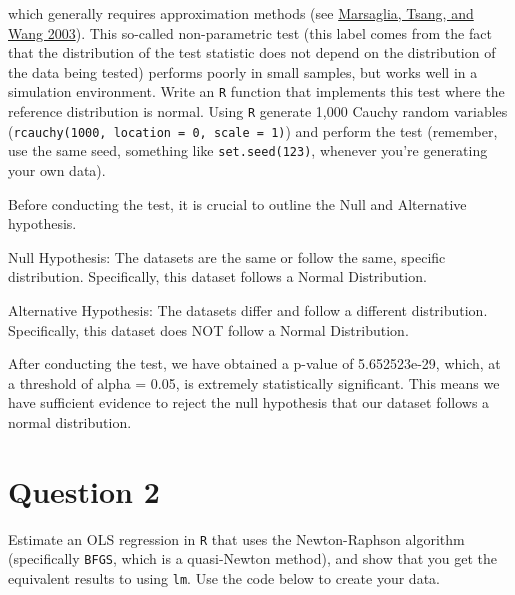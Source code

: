 \documentclass[12pt,letterpaper]{article}
\begin{document}
\noindent which generally requires approximation methods (see \href{https://core.ac.uk/download/pdf/25787785.pdf}{Marsaglia, Tsang, and Wang 2003}). This so-called non-parametric test (this label comes from the fact that the distribution of the test statistic does not depend on the distribution of the data being tested) performs poorly in small samples, but works well in a simulation environment. Write an \texttt{R} function that implements this test where the reference distribution is normal. Using \texttt{R} generate 1,000 Cauchy random variables (\texttt{rcauchy(1000, location = 0, scale = 1)}) and perform the test (remember, use the same seed, something like \texttt{set.seed(123)}, whenever you're generating your own data).\\
\begin{description}
	\item Before conducting the test, it is crucial to outline the Null and Alternative hypothesis. 
	\item	Null Hypothesis: The datasets are the same or follow the same, specific distribution. Specifically, this dataset follows a Normal Distribution. 
	\item 	Alternative Hypothesis: The datasets differ and follow a different distribution. Specifically,
	this dataset does NOT follow a Normal Distribution.
\end{description}
	
		 
	
\begin{description}
	\item \noindent After conducting the test, we have obtained a p-value of 5.652523e-29, which, at a threshold of alpha = 0.05, is extremely statistically significant. This means we have sufficient evidence to reject the null hypothesis that our dataset follows a normal distribution.  
\end{description}

\vspace{3in}

\section*{Question 2}
\noindent Estimate an OLS regression in \texttt{R} that uses the Newton-Raphson algorithm (specifically \texttt{BFGS}, which is a quasi-Newton method), and show that you get the equivalent results to using \texttt{lm}. Use the code below to create your data.
\vspace{2cm}
 
\end{document}
